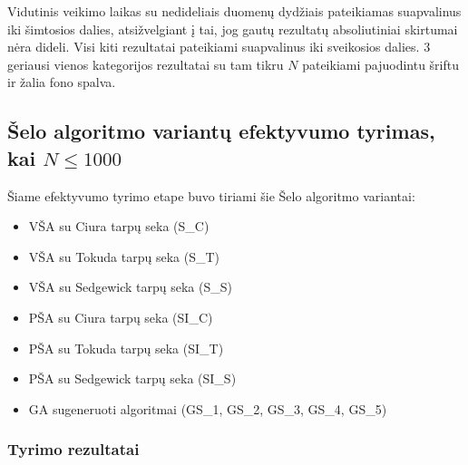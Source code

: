 \documentclass{VUMIFInfKursinis}
\begin{document}
Vidutinis veikimo laikas su nedideliais duomenų dydžiais pateikiamas suapvalinus iki šimtosios dalies,
atsižvelgiant į tai, jog gautų rezultatų absoliutiniai skirtumai nėra dideli.
Visi kiti rezultatai pateikiami suapvalinus iki sveikosios dalies.
3 geriausi vienos kategorijos rezultatai su tam tikru $N$ pateikiami pajuodintu šriftu ir žalia fono spalva.

\subsection{Šelo algoritmo variantų efektyvumo tyrimas, kai $N \leq 1000$}

Šiame efektyvumo tyrimo etape buvo tiriami šie Šelo algoritmo variantai:
\begin{itemize}
  \item VŠA su Ciura tarpų seka (S\_C)
  \item VŠA su Tokuda tarpų seka (S\_T)
  \item VŠA su Sedgewick tarpų seka (S\_S)
  \item PŠA su Ciura tarpų seka (SI\_C)
  \item PŠA su Tokuda tarpų seka (SI\_T)
  \item PŠA su Sedgewick tarpų seka (SI\_S)
  \item GA sugeneruoti algoritmai (GS\_1, GS\_2, GS\_3, GS\_4, GS\_5)
\end{itemize}

\subsubsection{Tyrimo rezultatai}
\end{document}
